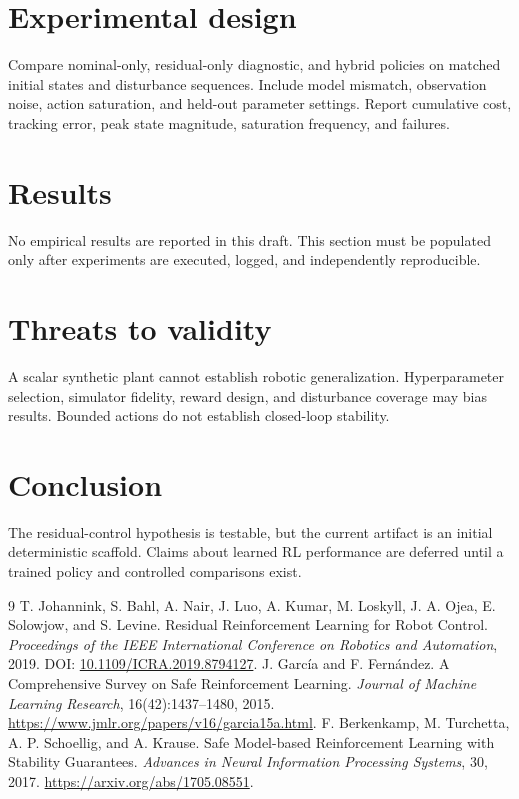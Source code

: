 \documentclass[11pt]{article}
\begin{document}
\section{Experimental design}
Compare nominal-only, residual-only diagnostic, and hybrid policies on matched initial states and disturbance sequences. Include model mismatch, observation noise, action saturation, and held-out parameter settings. Report cumulative cost, tracking error, peak state magnitude, saturation frequency, and failures.
\section{Results}
No empirical results are reported in this draft. This section must be populated only after experiments are executed, logged, and independently reproducible.
\section{Threats to validity}
A scalar synthetic plant cannot establish robotic generalization. Hyperparameter selection, simulator fidelity, reward design, and disturbance coverage may bias results. Bounded actions do not establish closed-loop stability.
\section{Conclusion}
The residual-control hypothesis is testable, but the current artifact is an initial deterministic scaffold. Claims about learned RL performance are deferred until a trained policy and controlled comparisons exist.
\begin{thebibliography}{9}
 T. Johannink, S. Bahl, A. Nair, J. Luo, A. Kumar, M. Loskyll, J. A. Ojea, E. Solowjow, and S. Levine. Residual Reinforcement Learning for Robot Control. \textit{Proceedings of the IEEE International Conference on Robotics and Automation}, 2019. DOI: \href{https://doi.org/10.1109/ICRA.2019.8794127}{10.1109/ICRA.2019.8794127}.
 J. García and F. Fernández. A Comprehensive Survey on Safe Reinforcement Learning. \textit{Journal of Machine Learning Research}, 16(42):1437--1480, 2015. \url{https://www.jmlr.org/papers/v16/garcia15a.html}.
 F. Berkenkamp, M. Turchetta, A. P. Schoellig, and A. Krause. Safe Model-based Reinforcement Learning with Stability Guarantees. \textit{Advances in Neural Information Processing Systems}, 30, 2017. \url{https://arxiv.org/abs/1705.08551}.
\end{thebibliography}
\end{document}
